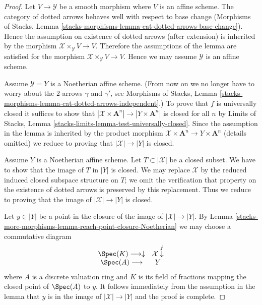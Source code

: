 \begin{proof}
Let $V \to \mathcal{Y}$ be a smooth morphism where $V$ is an affine scheme.
The category of dotted arrows behaves well with respect to base change
(Morphisms of Stacks, Lemma
\ref{stacks-morphisms-lemma-cat-dotted-arrows-base-change}).
Hence the assumption on existence of dotted arrows (after extension)
is inherited by the morphism $\mathcal{X} \times_\mathcal{Y} V \to V$.
Therefore the assumptions of the lemma are satisfied for the morphism
$\mathcal{X} \times_\mathcal{Y} V \to V$.
Hence we may assume $\mathcal{Y}$ is an affine scheme.

\medskip\noindent
Assume $\mathcal{Y} = Y$ is a Noetherian affine scheme.
(From now on we no longer have to worry about the
$2$-arrows $\gamma$ and $\gamma'$, see Morphisms of Stacks, Lemma
\ref{stacks-morphisms-lemma-cat-dotted-arrows-independent}.)
To prove that $f$ is universally closed it suffices to show that
$|\mathcal{X} \times \mathbf{A}^n| \to |Y \times \mathbf{A}^n|$ is closed
for all $n$ by Limits of Stacks, Lemma
\ref{stacks-limits-lemma-test-universally-closed}. Since the assumption
in the lemma is inherited by the product morphism
$\mathcal{X} \times \mathbf{A}^n \to Y \times \mathbf{A}^n$ (details omitted)
we reduce to proving that $|\mathcal{X}| \to |Y|$ is closed.

\medskip\noindent
Assume $Y$ is a Noetherian affine scheme.
Let $T \subset |\mathcal{X}|$ be a closed subset. We have to show that
the image of $T$ in $|Y|$ is closed. We may replace $\mathcal{X}$
by the reduced induced closed subspace structure on $T$; we
omit the verification that property on the existence of
dotted arrows is preserved by this replacement.
Thus we reduce to proving that the image
of $|\mathcal{X}| \to |Y|$ is closed.

\medskip\noindent
Let $y \in |Y|$ be a point in the closure of the image of
$|\mathcal{X}| \to |Y|$. By Lemma \ref{stacks-more-morphisms-lemma-reach-point-closure-Noetherian}
we may choose a commutative diagram
$$
\begin{array}{cc}\Spec(K) \longrightarrow\downarrow & \mathcal{X} \overset{f}{\downarrow} \\ \Spec(A) \longrightarrow & Y\end{array}
$$
where $A$ is a discrete valuation ring and $K$ is its field of fractions
mapping the closed point of $\Spec(A)$ to $y$. It follows immediately
from the assumption in the lemma that $y$ is in the image of
$|\mathcal{X}| \to |Y|$ and the proof is complete.
\end{proof}

